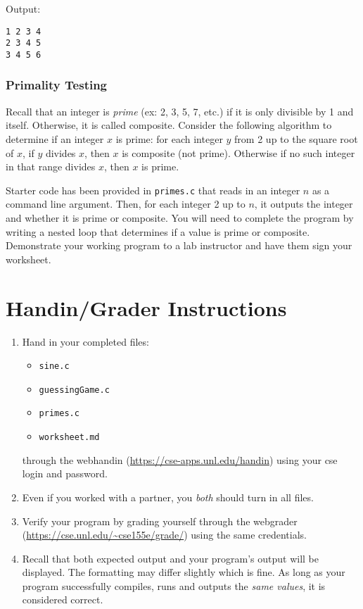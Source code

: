 \documentclass[12pt]{scrartcl}
\begin{document}
Output:

\begin{verbatim}
1 2 3 4
2 3 4 5
3 4 5 6
\end{verbatim}

\subsubsection*{Primality Testing}

Recall that an integer is \emph{prime} (ex: 2, 3, 5, 7, etc.) if it 
is only divisible by 1 and itself.  Otherwise, it is called composite.  
Consider the following algorithm to determine if an integer $x$ is 
prime: for each integer $y$ from 2 up to the square root of $x$, if $y$ 
divides $x$, then $x$ is composite (not prime).  Otherwise if no such 
integer in that range divides $x$, then $x$ is prime.  

Starter code has been provided in \texttt{primes.c}
that reads in an integer $n$ as a command line argument.  Then, for 
each integer 2 up to $n$, it outputs the integer 
and whether it is prime or composite.  You will need to complete
the program by writing a nested loop that determines if a value
is prime or composite.  Demonstrate your working 
program to a lab instructor and have them sign your worksheet.

\section{Handin/Grader Instructions}

\begin{enumerate}
  \item Hand in your completed files:
  \begin{itemize}
    \item \texttt{sine.c}
    \item \texttt{guessingGame.c}
    \item \texttt{primes.c}
    \item \texttt{worksheet.md}
  \end{itemize}
  through the webhandin (\url{https://cse-apps.unl.edu/handin}) 
  using your cse login and password.  
  \item Even if you worked with a partner, you \emph{both} should
  turn in all files.
  \item Verify your program by grading yourself through the
  webgrader (\url{https://cse.unl.edu/~cse155e/grade/}) using the
  same credentials.
  \item Recall that both expected output and your program's output
  will be displayed.  The formatting may differ slightly which is fine.
  As long as your program successfully compiles, runs and outputs 
  the \emph{same values}, it is considered correct.
\end{enumerate}
\end{document}
